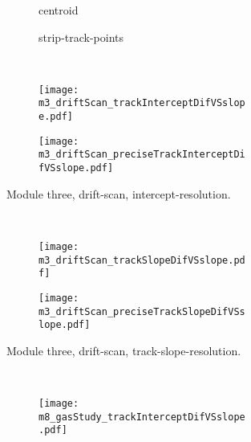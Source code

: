 \documentclass[
twoside,            %
BCOR1.4cm,          %
10pt,               %
headings=normal,    %
headsepline,        %
clearplainpage,		%
final,              %
div=14,
open=right,
bibliography=toc
]{scrreprt}
\begin{document}
\begin{figure}[!h]
	\begin{subfigure}[b]{\textwidth}
		\begin{subfigure}[b]{0.48\textwidth}
			\centering
			centroid
		\end{subfigure}
		\hfill
		\begin{subfigure}[b]{0.48\textwidth}
			\centering
			strip-track-points
		\end{subfigure}
	\end{subfigure}
	\vspace{1mm}
	\\
	\begin{subfigure}[b]{\textwidth}
		\begin{subfigure}[b]{0.48\textwidth}
			\centering
			\texttt{[image: m3\_driftScan\_trackInterceptDifVSslope.pdf]}
		\end{subfigure}
		\hfill
		\begin{subfigure}[b]{0.48\textwidth}
			\centering
			\texttt{[image: m3\_driftScan\_preciseTrackInterceptDifVSslope.pdf]}
		\end{subfigure}
		\caption{
			Module three, drift-scan, intercept-resolution.
		}
	\end{subfigure}
	\\
	\begin{subfigure}[b]{\textwidth}
		\begin{subfigure}[b]{0.48\textwidth}
			\centering
			\texttt{[image: m3\_driftScan\_trackSlopeDifVSslope.pdf]}
		\end{subfigure}
		\hfill
		\begin{subfigure}[b]{0.48\textwidth}
			\centering
			\texttt{[image: m3\_driftScan\_preciseTrackSlopeDifVSslope.pdf]}
		\end{subfigure}
		\caption{
			Module three, drift-scan, track-slope-resolution.
		}
	\end{subfigure}
	\\
	\begin{subfigure}[b]{\textwidth}
		\begin{subfigure}[b]{0.48\textwidth}
			\centering
			\texttt{[image: m8\_gasStudy\_trackInterceptDifVSslope.pdf]}
		\end{subfigure}
		\hfill
		\begin{subfigure}[b]{0.48\textwidth}
			\centering

\end{subfigure}
\end{subfigure}
\end{figure}
\end{document}
